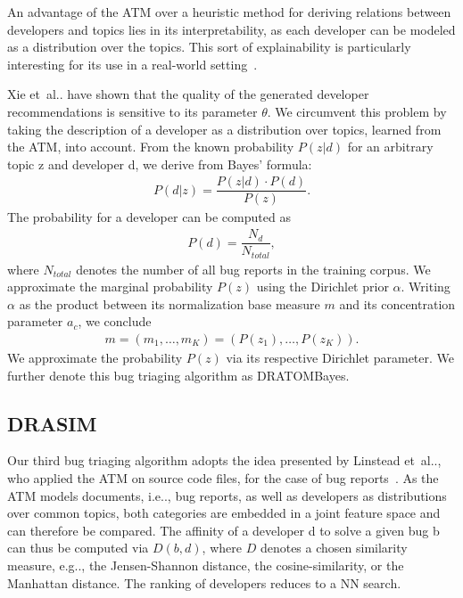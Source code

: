 \documentclass[a4paper,twoside]{article}
\makeatletter
\DeclareRobustCommand\onedot{\futurelet\@let@token\@onedot}
\def\@onedot{\ifx\@let@token.\else.\null\fi\xspace}
\def\etal{et~al\onedot}
\def\eg{e.g\onedot,\xspace}
\def\ie{i.e\onedot,\xspace}
\makeatother
\begin{document}
An advantage of the \ac{ATM} over a heuristic method for deriving relations between developers and topics lies in its interpretability, as each developer can be modeled as a distribution over the topics.
This sort of explainability is particularly interesting for its use in a real-world setting~\cite{Zou2020HowTechniques,Aktas2020AutomatedCase}.

Xie \etal have shown that the quality of the generated developer recommendations is sensitive to its parameter $\theta$. %
We circumvent this problem by taking the description of a developer as a distribution over topics, learned from the \ac{ATM}, into account.
From the known probability $P(z \vert d)$ for an arbitrary topic z and developer d, we derive from Bayes' formula:
\begin{align}
    P(d \vert z) = \dfrac{P(z \vert d) \cdot P(d)}{P(z)}. \label{eq:DRATOM_Bayes}
\end{align}
The probability for a developer can be computed as
\begin{align}
    P(d) = \dfrac{N_d}{N_{total}},
\end{align}
where $N_{total}$ denotes the number of all bug reports in the training corpus.
We approximate the marginal probability $P(z)$ using the Dirichlet prior $\alpha$. 
Writing $\alpha$ as the product between its normalization base measure $m$ and its concentration parameter $a_c$, we conclude
\begin{align}
    m = (m_1, \dots, m_K) = (P(z_1), \dots, P(z_K)).
\end{align}
We approximate the probability $P(z)$ via its respective Dirichlet parameter.
We further denote this bug triaging algorithm as \ac{DRATOMBayes}.

\subsection{DRASIM}
Our third bug triaging algorithm adopts the idea presented by Linstead \etal, who applied the \ac{ATM} on source code files, for the case of bug reports~\cite{linstead2007eclipseeeveloper}.
As the \ac{ATM} models documents, \ie bug reports, as well as developers as distributions over common topics, both categories are embedded in a joint feature space and can therefore be compared.
The affinity of a developer d to solve a given bug b can thus be computed via $D(b, d)$, where $D$ denotes a chosen similarity measure, \eg the Jensen-Shannon distance, the cosine-similarity, or the Manhattan distance.
The ranking of developers reduces to a \ac{NN} search.
\end{document}
